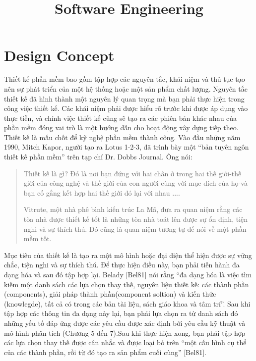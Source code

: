 \documentclass[11pt,a4paper,oneside]{report}
\title{Software Engineering}
\begin{document}
	\maketitle
	\listoffigures
	\listoftables
	\tableofcontents 
	\setcounter{chapter}{7}
	\chapter{Design Concept}
	Thiết kế phần mềm  bao gồm tập hợp các nguyên tắc, khái niệm và thủ tục tạo nên sự phát triển của một hệ thống hoặc một  sản phẩm chất lượng. Nguyên tắc thiết kế đã hình thành một nguyên lý quan trọng mà bạn phải thực hiện trong công việc thiết kế. Các khái niệm  phải được hiểu rõ trước khi được áp dụng vào thực tiễn, và chính việc thiết kế cũng sẽ tạo ra các phiên bản khác nhau của phần mềm đóng vai trò là một hướng dẫn cho hoạt động xây dựng tiếp theo.
	Thiết kế là mấu chốt để kỹ nghệ phần mềm thành công. Vào đầu những năm 1990, Mitch Kapor, người tạo ra Lotus 1-2-3, đã trình bày một “bản tuyên ngôn thiết kế phần mềm” trên tạp chí Dr. Dobbs Journal. Ông nói:
	
	\begin{quotation}
		Thiết kế là gì? Đó là nơi bạn đứng với hai chân ở trong hai thế giới-thế giới của công nghệ và thế giới của con người  cùng với  mục đích của họ-và bạn cố gắng kết hợp hai thế giới đó lại với nhau ....
		
		Vitrute, một nhà phê bình kiến trúc La Mã, đưa ra quan niệm rằng các tòa nhà được thiết kế tốt là những tòa nhà toát lên được sự ổn định, tiện nghi và sự thích thú. Đó cũng là quan niệm tương tự để nói về một phần mềm tốt.
	\end{quotation}	
	
	Mục tiêu của thiết kế là tạo ra một mô hình hoặc đại diện thể hiện được sự vững chắc, tiện nghi và sự thích thú. Để thực hiện điều này, bạn phải tiến hành đa dạng hóa và sau đó tập hợp lại. Belady [Bel81] nói rằng “đa dạng hóa  là việc tìm kiếm một danh sách các lựa chọn thay thế, nguyên liệu thiết kế: các thành phần (components), giải pháp thành phần(component soltion) và kiến thức (knowlegde), tất cả có trong các bản tài liệu, sách giáo khoa và tâm trí”. Sau khi tập hợp các thông tin đa dạng này lại, bạn phải lựa chọn ra từ danh sách đó những yếu tố đáp ứng được các yêu cầu được xác định bởi yêu cầu kỹ thuật và mô hình phân tích (Chương 5 đến 7).Sau khi thực hiện xong, bạn phải tập hợp các lựa chọn thay thế được cân nhắc và được loại bỏ  trên “một cấu hình cụ thể của các thành phần, rồi từ đó tạo ra sản phẩm cuối cùng” [Bel81].
	
\end{document}
